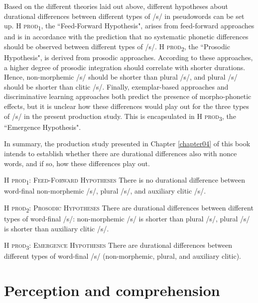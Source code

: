 Based on the different theories laid out above, different hypotheses about durational differences between different types of /s/ in pseudowords can be set up. \textsc{H prod\textsubscript{1}}, the ``Feed-Forward Hypothesis", arises from feed-forward approaches and is in accordance with the prediction that no systematic phonetic differences should be observed between different types of /s/. \textsc{H prod\textsubscript{2}}, the ``Prosodic Hypothesis", is derived from prosodic approaches. According to these approaches, a higher degree of prosodic integration should correlate with shorter durations. Hence, non-morphemic /s/ should be shorter than plural /s/, and plural /s/ should be shorter than clitic /s/. Finally, exemplar-based approaches and discriminative learning approaches both predict the presence of morpho-phonetic effects, but it is unclear how these differences would play out for the three types of /s/ in the present production study. This is encapsulated in \textsc{H prod\textsubscript{3}}, the ``Emergence Hypothesis". 

In summary, the production study presented in Chapter \ref{chapter04} of this book intends to establish whether there are durational differences also with nonce words, and if so, how these differences play out.

\begin{description}
\item\textsc{H prod\textsubscript{1}}: \textsc{Feed-Forward Hypotheses} \newline
There is no durational difference between word-final non-morphemic /s/, plural /s/, and auxiliary clitic /s/.

\item\textsc{H prod\textsubscript{2}}: \textsc{Prosodic Hypotheses} \newline
There are durational differences between different types of word-final /s/: 
non-morphemic /s/ is shorter than plural /s/, plural /s/ is shorter than auxiliary clitic /s/.

\item\textsc{H prod\textsubscript{3}}: \textsc{Emergence Hypotheses} \newline
There are durational differences between different types of word-final /s/ (non-morphemic, plural, and auxiliary clitic).
\end{description}

\section{Perception and comprehension}\label{section02_2}

